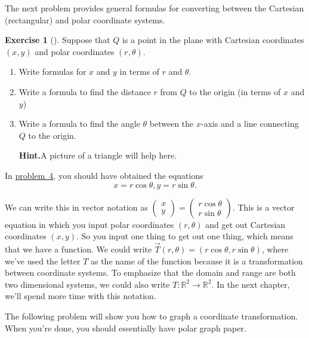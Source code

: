 \documentclass[10pt,]{book}
\theoremstyle{plain}
\theoremstyle{definition}
\theoremstyle{definition}
\theoremstyle{definition}
\theoremstyle{definition}
\newtheorem{exploration}[project]{Exercise}
\theoremstyle{definition}
\numberwithin{equation}{section}
\begin{document}
The next problem provides general formulas for converting between the Cartesian (rectangular) and polar coordinate systems.%
\begin{exploration}[]\label{prob_polar_coordinate_equations}
Suppose that \(Q\) is a point in the plane with Cartesian coordinates \((x,y)\) and polar coordinates \((r,\theta)\).%
\begin{enumerate}[font=\bfseries,label=(\alph*),ref=\alph*]
\item\label{task-140} Write formulas for \(x\) and \(y\) in terms of \(r\) and \(\theta\).%
\item\label{task-141} Write a formula to find the distance \(r\) from \(Q\) to the origin (in terms of \(x\) and \(y\))%
\item\label{task-142} Write a formula to find the angle \(\theta\) between the \(x\)-axis and a line connecting \(Q\) to the origin.%
\par\medskip\noindent%
\textbf{Hint.}\quad A picture of a triangle will help here.%
\end{enumerate}
\end{exploration}
In \hyperref[prob_polar_coordinate_equations]{problem~4}, you should have obtained the equations%
\begin{equation*}
x=r\cos\theta,  y=r\sin\theta.
\end{equation*}
%
\par
We can write this in vector notation as \(\begin{pmatrix}x\\y
\end{pmatrix} =\begin{pmatrix}r\cos\theta\\ r\sin\theta
\end{pmatrix}\). This is a vector equation in which you input polar coordinates \((r,\theta)\) and get out Cartesian coordinates \((x,y)\). So you input one thing to get out one thing, which means that we have a function. We could write \(\vec T(r,\theta) = (r\cos\theta,r\sin\theta)\), where we've used the letter \(T\) as the name of the function because it is a transformation between coordinate systems. To emphasize that the domain and range are both two dimensional systems, we could also write \(T:\mathbb{R}^2\to\mathbb{R}^2\). In the next chapter, we'll spend more time with this notation.%
\par
The following problem will show you how to graph a coordinate transformation. When you're done, you should essentially have polar graph paper.%
\end{document}

